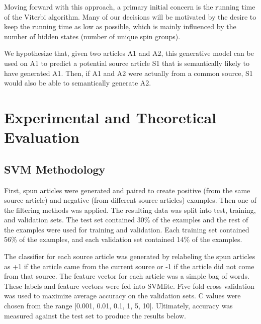 \documentclass[11pt,letterpaper,oneside, titlepage]{scrartcl}
\begin{document}
Moving forward with this approach, a primary initial concern is the running time of the Viterbi algorithm. Many of our decisions will be motivated by the desire to keep the running time as low as possible, which is mainly influenced by the number of hidden states (number of unique spin groups).

We hypothesize that, given two articles A1 and A2, this generative model can be used on A1 to predict a potential source article S1 that is semantically likely to have generated A1. Then, if A1 and A2 were actually from a common source, S1 would also be able to semantically generate A2.


\section{Experimental and Theoretical Evaluation }

\subsection{SVM Methodology}


First, spun articles were generated and paired to create positive (from the same source article) and negative (from different source articles) examples.  Then one of the filtering methods was applied.  The resulting data was split into test, training, and validation sets.  The test set contained 30\% of the examples and the rest of the examples were used for training and validation. Each training set contained 56\% of the examples, and each validation set contained 14\% of the examples.

The classifier for each source article was generated by relabeling the spun articles as +1 if the article came from the current source or -1 if the article did not come from that source. The feature vector for each article was a simple bag of words. These labels and feature vectors were fed into SVMlite. Five fold cross validation was used to maximize average accuracy on the validation sets. C values were chosen from the range [0.001, 0.01, 0.1, 1, 5, 10]. Ultimately, accuracy was measured against the test set to produce the results below.
\end{document}
